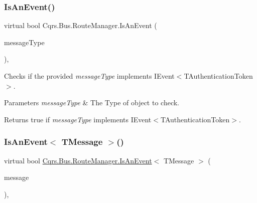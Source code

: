 \subsubsection{\texorpdfstring{Is\+An\+Event()}{IsAnEvent()}}
{\footnotesize\ttfamily virtual bool Cqrs.\+Bus.\+Route\+Manager.\+Is\+An\+Event (\begin{DoxyParamCaption}\item[{Type}]{message\+Type }\end{DoxyParamCaption})\hspace{0.3cm}{\ttfamily [protected]}, {\ttfamily [virtual]}}



Checks if the provided {\itshape message\+Type}  implements I\+Event$<$\+T\+Authentication\+Token$>$. 


\begin{DoxyParams}{Parameters}
{\em message\+Type} & The Type of object to check.\\
\hline
\end{DoxyParams}
\begin{DoxyReturn}{Returns}
true if {\itshape message\+Type}  implements I\+Event$<$\+T\+Authentication\+Token$>$.
\end{DoxyReturn}
\mbox{\label{classCqrs_1_1Bus_1_1RouteManager_a7e5099741cd4b3e538599c771581a4b6_a7e5099741cd4b3e538599c771581a4b6}} 
\subsubsection{\texorpdfstring{Is\+An\+Event$<$ T\+Message $>$()}{IsAnEvent< TMessage >()}}
{\footnotesize\ttfamily virtual bool \hyperlink{classCqrs_1_1Bus_1_1RouteManager_a7b9b2ad8b9f5d7761b0f45c033b96101_a7b9b2ad8b9f5d7761b0f45c033b96101}{Cqrs.\+Bus.\+Route\+Manager.\+Is\+An\+Event}$<$ T\+Message $>$ (\begin{DoxyParamCaption}\item[{T\+Message}]{message }\end{DoxyParamCaption})\hspace{0.3cm}{\ttfamily [protected]}, {\ttfamily [virtual]}}




